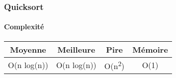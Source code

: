 
\begin{frame}
\frametitle{Quicksort}
\framesubtitle{Complexité}
\begin{table}
\begin{tabular}{| c | c | c | c |}
\hline
Moyenne & Meilleure & Pire & Mémoire\\ 
\hline
O(n log(n)) & O(n log(n)) & O(n\textsuperscript{2}) & O(1)\\
\hline
\end{tabular}
\end{table}
\end{frame}
